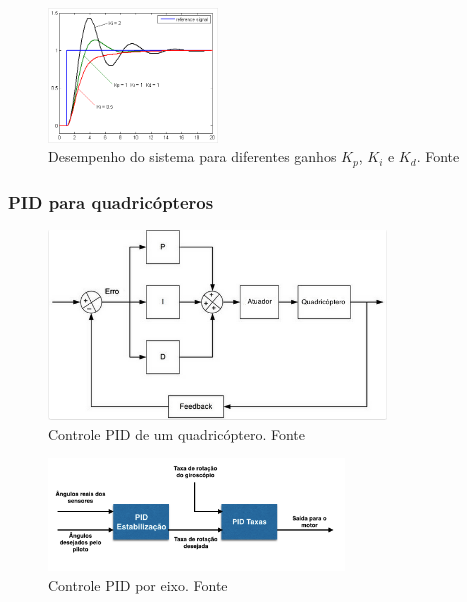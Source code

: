 \documentclass{beamer}
\begin{document}
\begin{frame}[allowframebreaks]
\begin{itemize}
		\vspace{1cm}
		\begin{figure}[h]
			\centering
			\includegraphics[keepaspectratio = true,
			width=0.4\textwidth]{img/ganho_PID.png}
			\caption{Desempenho do sistema para diferentes ganhos $K_p$, $K_i$ e $K_d$. Fonte \cite{Kingdom}}
			\label{fig:ganhoPID}
		\end{figure}	
	
	\end{itemize}
	
\end{frame}	

\begin{frame}[allowframebreaks]
	
	\frametitle{PID para quadricópteros}
	
	\begin{figure}[h]
		\centering
		\includegraphics[keepaspectratio = true,
		width=0.8\textwidth]{img/PID_quad_geral.png}
		\caption{Controle PID de um quadricóptero. Fonte \cite{Liang}}
		\label{fig:PIDquad}
	\end{figure}
	
	\framebreak
	
	\begin{figure}[h]
		\centering
		\includegraphics[keepaspectratio = true,
		width=0.7\textwidth]{img/PID_quad_axis.png}
		\caption{Controle PID por eixo. Fonte \cite{Liang}}
		\label{fig:PIDaxis}
	\end{figure}
	
	
\end{frame}	
\end{document}
